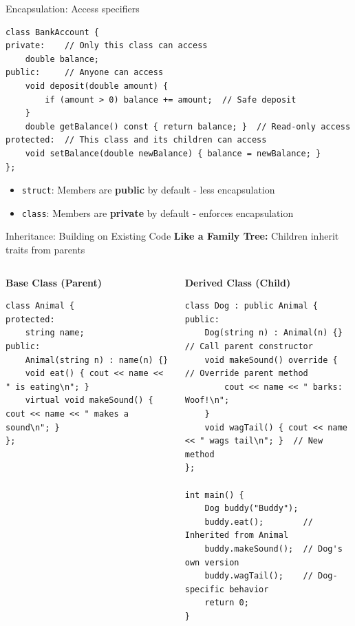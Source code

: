 \begin{frame}[fragile]{Encapsulation: Access specifiers}
	\begin{verbatim}
class BankAccount {
private:    // Only this class can access
    double balance;
public:     // Anyone can access
    void deposit(double amount) {
        if (amount > 0) balance += amount;  // Safe deposit
    }
    double getBalance() const { return balance; }  // Read-only access
protected:  // This class and its children can access
    void setBalance(double newBalance) { balance = newBalance; }
};
    \end{verbatim}
	\begin{itemize}
		\item \texttt{struct}: Members are \textbf{public} by default - less encapsulation
		\item \texttt{class}: Members are \textbf{private} by default - enforces encapsulation
	\end{itemize}
\end{frame}

\begin{frame}[fragile]{Inheritance: Building on Existing Code}
	\textbf{Like a Family Tree:} Children inherit traits from parents

	\begin{columns}
		\begin{column}{0.3\textwidth}
			\textbf{Base Class (Parent)}
			\begin{verbatim}
class Animal {
protected:
    string name;
public:
    Animal(string n) : name(n) {}
    void eat() { cout << name << " is eating\n"; }
    virtual void makeSound() { cout << name << " makes a sound\n"; }
};
    \end{verbatim}
		\end{column}
		\begin{column}{0.7\textwidth}
			\textbf{Derived Class (Child)}
			\begin{verbatim}
class Dog : public Animal {
public:
    Dog(string n) : Animal(n) {}  // Call parent constructor
    void makeSound() override {        // Override parent method
        cout << name << " barks: Woof!\n";
    }
    void wagTail() { cout << name << " wags tail\n"; }  // New method
};

int main() {
    Dog buddy("Buddy");
    buddy.eat();        // Inherited from Animal
    buddy.makeSound();  // Dog's own version
    buddy.wagTail();    // Dog-specific behavior
    return 0;
}
    \end{verbatim}
		\end{column}
	\end{columns}
\end{frame}

